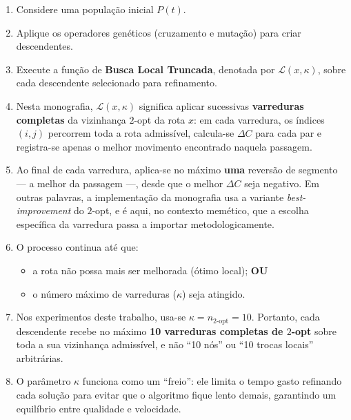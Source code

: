 \begin{enumerate}
  \def\labelenumi{\arabic{enumi}.}
  \tightlist
  \item
        Considere uma população inicial \(P(t)\).
  \item
        Aplique os operadores genéticos (cruzamento e mutação) para criar
        descendentes.
  \item
        Execute a função de \textbf{Busca Local Truncada}, denotada por
        \(\mathcal{L}(x, \kappa)\), sobre cada descendente selecionado para
        refinamento.
  \item
        Nesta monografia, \(\mathcal{L}(x, \kappa)\) significa aplicar
        sucessivas \textbf{varreduras completas} da vizinhança \(2\)-opt da
        rota \(x\): em cada varredura, os índices \((i,j)\) percorrem toda a
        rota admissível, calcula-se \(\Delta C\) para cada par e registra-se
        apenas o melhor movimento encontrado naquela passagem.
  \item
        Ao final de cada varredura, aplica-se no máximo \textbf{uma} reversão
        de segmento --- a melhor da passagem ---, desde que o melhor
        \(\Delta C\) seja negativo. Em outras palavras, a implementação da
        monografia usa a variante \emph{best-improvement} do \(2\)-opt, e é
        aqui, no contexto memético, que a escolha específica da varredura
        passa a importar metodologicamente.
  \item
        O processo continua até que:

        \begin{itemize}
          \tightlist
          \item
                a rota não possa mais ser melhorada (ótimo local); \textbf{OU}
          \item
                o número máximo de varreduras (\(\kappa\)) seja atingido.
        \end{itemize}
  \item
        Nos experimentos deste trabalho, usa-se
        \(\kappa = n_{2\text{-opt}} = 10\). Portanto, cada descendente recebe
        no máximo \textbf{10 varreduras completas de \(2\)-opt} sobre toda a
        sua vizinhança admissível, e não ``10 nós'' ou ``10 trocas locais''
        arbitrárias.
  \item
        O parâmetro \(\kappa\) funciona como um ``freio'': ele limita o tempo
        gasto refinando cada solução para evitar que o algoritmo fique lento
        demais, garantindo um equilíbrio entre qualidade e velocidade.
\end{enumerate}

